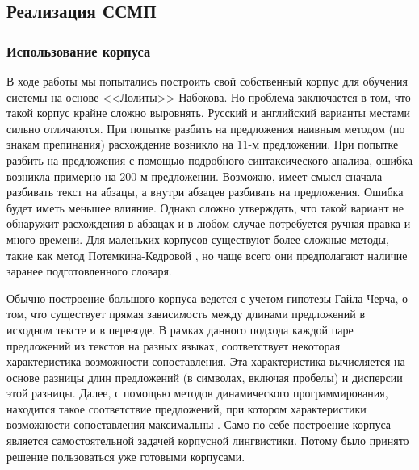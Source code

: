
\subsection{Реализация ССМП}

\subsubsection{Использование корпуса}


В ходе работы мы попытались построить свой собственный корпус 
для обучения системы на основе <<Лолиты>> Набокова. 
Но проблема заключается в том, что такой корпус крайне сложно выровнять.
Русский и английский варианты местами сильно отличаются.
При попытке разбить на предложения наивным методом (по знакам препинания) 
расхождение возникло на $11$-м предложении.
При попытке разбить на предложения с помощью подробного 
синтаксического анализа, ошибка возникла примерно 
на $200$-м предложении.
Возможно, имеет смысл сначала разбивать текст на абзацы, 
а внутри абзацев разбивать на предложения. 
Ошибка будет иметь меньшее влияние. 
Однако сложно утверждать, 
что такой вариант не обнаружит расхождения в абзацах 
и в любом случае потребуется ручная правка и много времени.
Для маленьких корпусов существуют более сложные методы, 
такие как метод Потемкина-Кедровой \cite{Потемкин:2007}, 
но чаще всего они предполагают наличие заранее подготовленного словаря.

Обычно построение большого корпуса ведется с учетом гипотезы Гайла-Черча, о том, что 
существует прямая зависимость между длинами предложений в исходном тексте и в переводе. 
В рамках данного подхода каждой паре предложений из текстов на разных языках, 
соответствует некоторая характеристика возможности сопоставления. 
Эта характеристика вычисляется на основе разницы длин предложений 
(в символах, включая пробелы) и дисперсии этой разницы. 
Далее, с помощью методов динамического программирования, 
находится такое соответствие предложений, 
при котором характеристики возможности сопоставления максимальны \cite{Липатов:2005}.
Само по себе построение корпуса является самостоятельной задачей корпусной лингвистики.
Потому было принято решение пользоваться уже готовыми корпусами.

\pagebreak

